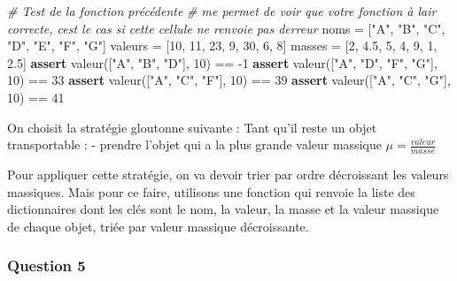 \documentclass[
  paper=a4,
  ,captions=tableheading
]{scrartcl}
\newenvironment{Shaded}{}{}
\newcommand{\CommentTok}[1]{\textcolor[rgb]{0.38,0.63,0.69}{\textit{#1}}}
\newcommand{\ControlFlowTok}[1]{\textcolor[rgb]{0.00,0.44,0.13}{\textbf{#1}}}
\newcommand{\DecValTok}[1]{\textcolor[rgb]{0.25,0.63,0.44}{#1}}
\newcommand{\FloatTok}[1]{\textcolor[rgb]{0.25,0.63,0.44}{#1}}
\newcommand{\NormalTok}[1]{#1}
\newcommand{\OperatorTok}[1]{\textcolor[rgb]{0.40,0.40,0.40}{#1}}
\newcommand{\StringTok}[1]{\textcolor[rgb]{0.25,0.44,0.63}{#1}}
\begin{document}
\begin{Shaded}
\begin{Highlighting}[]
\CommentTok{\# Test de la fonction précédente}
\CommentTok{\# me permet de voir que votre fonction à l\textquotesingle{}air correcte, c\textquotesingle{}est le cas si cette cellule ne renvoie pas d\textquotesingle{}erreur}
\NormalTok{noms }\OperatorTok{=}\NormalTok{ [}\StringTok{"A"}\NormalTok{, }\StringTok{"B"}\NormalTok{, }\StringTok{"C"}\NormalTok{, }\StringTok{"D"}\NormalTok{, }\StringTok{"E"}\NormalTok{, }\StringTok{"F"}\NormalTok{, }\StringTok{"G"}\NormalTok{]}
\NormalTok{valeurs }\OperatorTok{=}\NormalTok{ [}\DecValTok{10}\NormalTok{, }\DecValTok{11}\NormalTok{, }\DecValTok{23}\NormalTok{, }\DecValTok{9}\NormalTok{, }\DecValTok{30}\NormalTok{, }\DecValTok{6}\NormalTok{, }\DecValTok{8}\NormalTok{]}
\NormalTok{masses }\OperatorTok{=}\NormalTok{ [}\DecValTok{2}\NormalTok{, }\FloatTok{4.5}\NormalTok{, }\DecValTok{5}\NormalTok{, }\DecValTok{4}\NormalTok{, }\DecValTok{9}\NormalTok{, }\DecValTok{1}\NormalTok{, }\FloatTok{2.5}\NormalTok{]}
\ControlFlowTok{assert}\NormalTok{ valeur([}\StringTok{"A"}\NormalTok{, }\StringTok{"B"}\NormalTok{, }\StringTok{"D"}\NormalTok{], }\DecValTok{10}\NormalTok{) }\OperatorTok{==} \OperatorTok{{-}}\DecValTok{1}
\ControlFlowTok{assert}\NormalTok{ valeur([}\StringTok{"A"}\NormalTok{, }\StringTok{"D"}\NormalTok{, }\StringTok{"F"}\NormalTok{, }\StringTok{"G"}\NormalTok{], }\DecValTok{10}\NormalTok{) }\OperatorTok{==} \DecValTok{33}
\ControlFlowTok{assert}\NormalTok{ valeur([}\StringTok{"A"}\NormalTok{, }\StringTok{"C"}\NormalTok{, }\StringTok{"F"}\NormalTok{], }\DecValTok{10}\NormalTok{) }\OperatorTok{==} \DecValTok{39}
\ControlFlowTok{assert}\NormalTok{ valeur([}\StringTok{"A"}\NormalTok{, }\StringTok{"C"}\NormalTok{, }\StringTok{"G"}\NormalTok{], }\DecValTok{10}\NormalTok{) }\OperatorTok{==} \DecValTok{41}
\end{Highlighting}
\end{Shaded}

On choisit la stratégie gloutonne suivante : Tant qu'il reste un objet
transportable : - prendre l'objet qui a la plus grande valeur massique
\(\mu=\frac{valeur}{masse}\)

Pour appliquer cette stratégie, on va devoir trier par ordre décroissant
les valeurs massiques. Mais pour ce faire, utilisons une fonction qui
renvoie la liste des dictionnaires dont les clés sont le nom, la valeur,
la masse et la valeur massique de chaque objet, triée par valeur
massique décroissante.

\hypertarget{question-5}{%
\subsubsection{Question 5}\label{question-5}}
\end{document}
